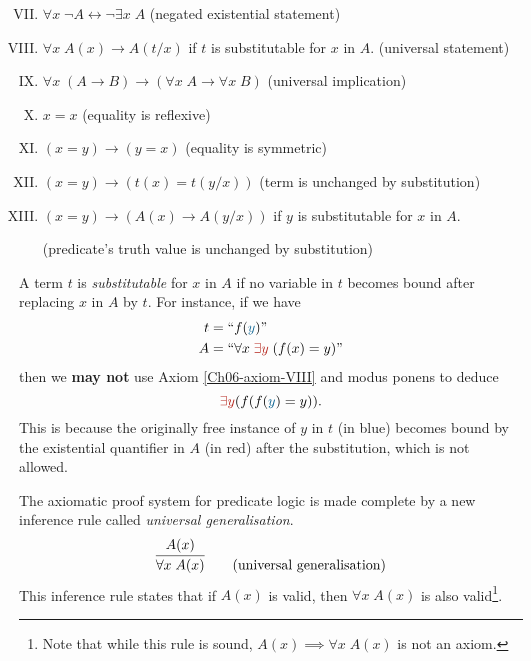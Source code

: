 \begin{enumerate}[I.]
    \setcounter{enumi}{6}
    \item \(\forall x\; \neg A \leftrightarrow \neg\exists x\; A\)
    \hfill (negated existential statement)
    \label{Ch06-axiom-VII}
    
    \item \(\forall x\; A(x) \rightarrow A(t/x)\) \;\; if \(t\) is substitutable for \(x\) in \(A\).
    \hfill (universal statement)
    \label{Ch06-axiom-VIII}
    
    \item \(\forall x\; (A \rightarrow B) \rightarrow (\forall x\; A \rightarrow \forall x\; B)\)
    \hfill (universal implication)
    \label{Ch06-axiom-IX}

    \item \(x = x\)
    \hfill (equality is reflexive)
    \label{Ch06-axiom-X}
    
    \item \((x = y) \rightarrow (y = x)\)
    \hfill (equality is symmetric)
    \label{Ch06-axiom-XI}
    
    \item \((x = y) \rightarrow (t(x) = t(y/x))\)
    \hfill (term is unchanged by substitution)
    \label{Ch06-axiom-XII}

    \item \((x = y) \rightarrow (A(x) \rightarrow A(y/x))\)\;\; if \(y\) is substitutable for \(x\) in \(A\).
    
    \hfill (predicate's truth value is unchanged by substitution)
    \label{Ch06-axiom-XIII}
\end{enumerate}

A term \(t\) is \emph{substitutable} for \(x\) in \(A\) if no variable in \(t\) becomes bound after replacing \(x\) in \(A\) by \(t\). For instance, if we have
%
\begin{align*}
    t &= ``f({\color{MidnightBlue} y})"\\
    A &= ``\forall x\; {\color{BrickRed}\exists y}\; (f(x) = y)"
\end{align*}
%
then we \textbf{may not} use Axiom \ref{Ch06-axiom-VIII} and modus ponens to deduce
%
\[{\color{BrickRed}\exists y} (f(f({\color{MidnightBlue} y}) = y))\text{.}\]
%
This is because the originally free instance of \(y\) in \(t\) (in blue) becomes bound by the existential quantifier in \(A\) (in red) after the substitution, which is not allowed.

The axiomatic proof system for predicate logic is made complete by a new inference rule called \emph{universal generalisation}.
%
\[
    \infer{\forall x\; A(x)}{A(x)}
    \tag{universal generalisation}
\]
%
This inference rule states that if \(A(x)\) is valid, then \(\forall x\; A(x)\) is also valid\footnote{Note that while this rule is sound, \(A(x) \implies \forall x\; A(x)\) is not an axiom.}.

